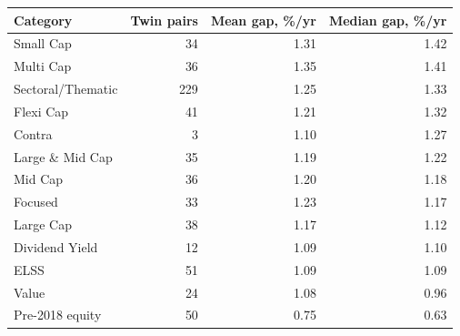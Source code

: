 \begin{tabular}{lrrr}
\toprule
Category & Twin pairs & Mean gap, \%/yr & Median gap, \%/yr \\
\midrule
Small Cap & 34 & 1.31 & 1.42 \\
Multi Cap & 36 & 1.35 & 1.41 \\
Sectoral/Thematic & 229 & 1.25 & 1.33 \\
Flexi Cap & 41 & 1.21 & 1.32 \\
Contra & 3 & 1.10 & 1.27 \\
Large \& Mid Cap & 35 & 1.19 & 1.22 \\
Mid Cap & 36 & 1.20 & 1.18 \\
Focused & 33 & 1.23 & 1.17 \\
Large Cap & 38 & 1.17 & 1.12 \\
Dividend Yield & 12 & 1.09 & 1.10 \\
ELSS & 51 & 1.09 & 1.09 \\
Value & 24 & 1.08 & 0.96 \\
Pre-2018 equity & 50 & 0.75 & 0.63 \\
\bottomrule
\end{tabular}
